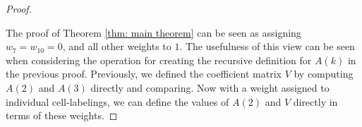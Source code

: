 \documentclass[12pt]{article}
\theoremstyle{plain}
\theoremstyle{definition}
\theoremstyle{remark}
\theoremstyle{definition}
\newcommand{\lablnode}[3]{\node[shape=circle,draw=none,fill=none, inner sep=0pt,minimum size=5pt] (A) at ( #1 , #2 ) {#3};}
\newcommand{\lablvertex}[3]{\node[shape=circle,draw=none,fill=white, inner sep=2pt,minimum size=5pt] (A) at ( #1 , #2 ) {#3};}
\begin{document}
\begin{proof}
\begin{center}
\end{center}

The proof of Theorem \ref{thm: main theorem} can be seen as assigning $w_{7} = w_{10} = 0$, and all other weights to $1$. The usefulness of this view can be seen when considering the operation for creating the recursive definition for $A(k)$ in the previous proof. Previously, we defined the coefficient matrix $V$ by computing $A(2)$ and $A(3)$ directly and comparing. Now with a weight assigned to individual cell-labelings, we can define the values of $A(2)$ and $V$ directly in terms of these weights.


\end{proof}
\end{document}
